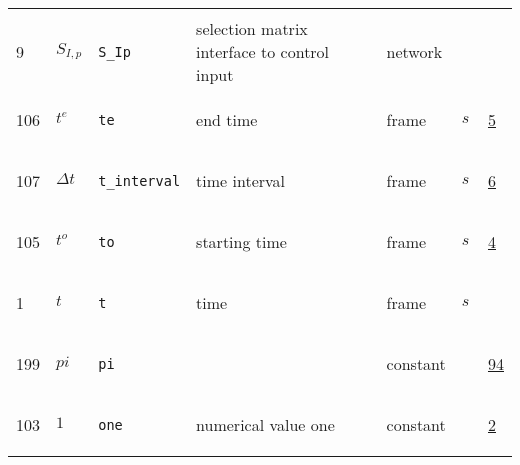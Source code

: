 \begin{longtable}{|p{1cm}|p{2.5cm}|p{4.5cm}|p{8cm}|p{3.0cm}|p{3cm}|p{1cm}|}
             & \\
            9
             & \hypertarget{"v:9"}{ $ {{S}}{_{I, p}} $}
             & \verb|S_Ip|
             & selection matrix interface to control input
             & \begin{lay}network \end{lay}
             & $  $
             & \\
            106
             & \hypertarget{"v:106"}{ $ {{t^e}}{_{}} $}
             & \verb|te|
             & end time
             & \begin{lay}frame \end{lay}
             & $ s \, $
             &                 \hyperlink{"e:5"}{ 5 }
                 \\
            107
             & \hypertarget{"v:107"}{ $ {{\Delta t}}{_{}} $}
             & \verb|t_interval|
             & time interval
             & \begin{lay}frame \end{lay}
             & $ s \, $
             &                 \hyperlink{"e:6"}{ 6 }
                 \\
            105
             & \hypertarget{"v:105"}{ $ {{t^o}}{_{}} $}
             & \verb|to|
             & starting time
             & \begin{lay}frame \end{lay}
             & $ s \, $
             &                 \hyperlink{"e:4"}{ 4 }
                 \\
            1
             & \hypertarget{"v:1"}{ $ {t}{_{}} $}
             & \verb|t|
             & time
             & \begin{lay}frame \end{lay}
             & $ s \, $
             & \\
            199
             & \hypertarget{"v:199"}{ $ {pi}{_{}} $}
             & \verb|pi|
             & 
             & \begin{lay}constant \end{lay}
             & $  $
             &                 \hyperlink{"e:94"}{ 94 }
                 \\
            103
             & \hypertarget{"v:103"}{ $ {1}{_{}} $}
             & \verb|one|
             & numerical value one
             & \begin{lay}constant \end{lay}
             & $  $
             &                 \hyperlink{"e:2"}{ 2 }
                 \\

\end{longtable}
